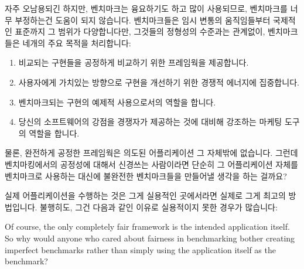 자주 오남용되긴 하지만, 벤치마크는 융요하기도 하고 많이 사용되므로, 벤치마크를
너무 부정하는건 도움이 되지 않습니다.
벤치마크들은 임시 변통의 움직임들부터 국제적인 표준까지 그 범위가 다양합니다만,
그것들의 정형성의 수준과는 관계없이, 벤치마크들은 네개의 주요 목적을
처리합니다:

\begin{enumerate}
\item	비교되는 구현들을 공정하게 비교하기 위한 프레임웍을 제공합니다.
\item	사용자에게 가치있는 방향으로 구현을 개선하기 위한 경쟁적 에너지에
	집중합니다.
\item	벤치마크되는 구현의 예제적 사용으로서의 역할을 합니다.
\item	당신의 소프트웨어의 강점을 경쟁자가 제공하는 것에 대비해 강조하는
	마케팅 도구의 역할을 합니다.

\end{enumerate}

물론, 완전하게 공정한 프레임웍은 의도된 어플리케이션 그 자체밖에 없습니다.
그런데 벤치마킹에서의 공정성에 대해서 신경쓰는 사람이라면 단순히 그
어플리케이션 자체를 벤치마크로 사용하는 대신에 불완전한 벤치마크들을 만들어낼
생각을 하는 걸까요?

실제 어플리케이션을 수행하는 것은 그게 실용적인 곳에서라면 실제로 그게 최고의
방법입니다.
불행히도, 그건 다음과 같인 이유로 실용적이지 못한 경우가 많습니다:
\iffalse

Of course,  the only completely fair framework is the intended
application itself.
So why would anyone who cared about fairness in benchmarking
bother creating imperfect benchmarks rather than simply
using the application itself as the benchmark?

